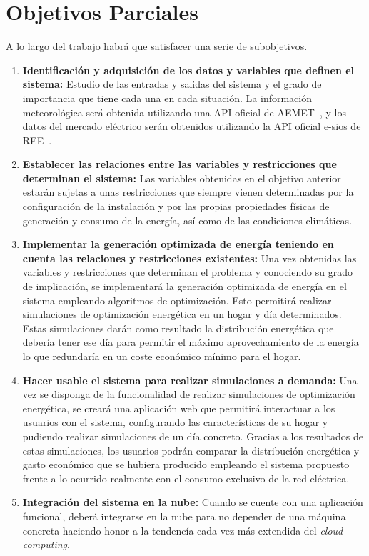 \section{Objetivos Parciales}
A lo largo del trabajo habrá que satisfacer una serie de subobjetivos.
\begin{enumerate}
	\item \textbf{Identificación y adquisición de los datos y variables que definen el sistema:}
	Estudio de las entradas y salidas del sistema y el grado de importancia que tiene cada una en cada situación. La información meteorológica será obtenida utilizando una \gls{API} oficial de \gls{AEMET}~\cite{Aemet}, y los datos del mercado eléctrico serán obtenidos utilizando la \gls{API} oficial e-sios de \gls{REE}~\cite{Ree}.

	\item \textbf{Establecer las relaciones entre las variables y restricciones que determinan el sistema:}
	Las variables obtenidas en el objetivo anterior estarán sujetas a unas restricciones que siempre vienen determinadas por la configuración de la instalación y por las propias propiedades físicas de generación y consumo de la energía, así como de las condiciones climáticas.

	\item \textbf{Implementar la generación optimizada de energía teniendo en cuenta las relaciones y restricciones existentes:}
	Una vez obtenidas las variables y restricciones que determinan el problema y conociendo su grado de implicación, se implementará la generación optimizada de energía en el sistema empleando algoritmos de optimización. Esto permitirá realizar simulaciones de optimización energética en un hogar y día determinados. Estas simulaciones darán como resultado la distribución energética que debería tener ese día para permitir el máximo aprovechamiento de la energía lo que redundaría en un coste económico mínimo para el hogar.

      \item \textbf{Hacer usable el sistema para realizar simulaciones a demanda:}
        Una vez se disponga de la funcionalidad de realizar simulaciones de optimización energética, se creará una aplicación web que permitirá interactuar a los usuarios con el sistema, configurando las características de su hogar y pudiendo realizar simulaciones de un día concreto. Gracias a los resultados de estas simulaciones, los usuarios podrán comparar la distribución energética y gasto económico que se hubiera producido empleando el sistema propuesto frente a lo ocurrido realmente con el consumo exclusivo de la red eléctrica.

      \item \textbf{Integración del sistema en la nube:}
        Cuando se cuente con una aplicación funcional, deberá integrarse en la nube para no depender de una máquina concreta haciendo honor a la tendencía cada vez más extendida del \textit{cloud computing}.

\end{enumerate}
